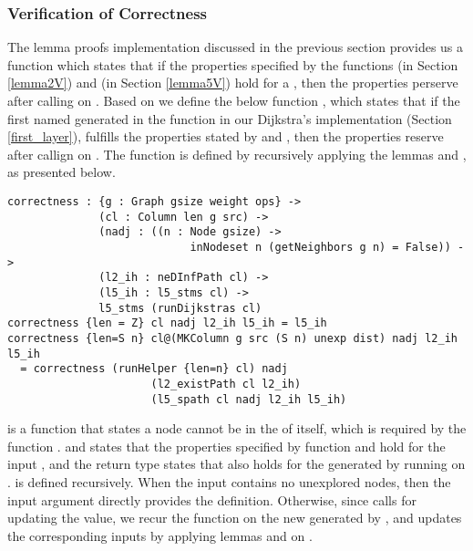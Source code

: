 \subsubsection{Verification of Correctness}
The lemma proofs implementation discussed in the previous section provides us a function  which states that if the  properties specified by the functions  (in Section \ref{lemma2V}) and (in Section \ref{lemma5V}) hold for a  , then the properties perserve after calling  on . Based on  we define the below function , which states that if the first  named  generated in the  function in our Dijkstra's implementation (Section \ref{first_layer}), fulfills the properties stated by  and , then the properties reserve after callign  on . The function  is defined by recursively applying the lemmas  and , as presented below. 
\\
\begin{lstlisting}
correctness : {g : Graph gsize weight ops} ->
              (cl : Column len g src) ->
              (nadj : ((n : Node gsize) -> 
                            inNodeset n (getNeighbors g n) = False)) ->
              (l2_ih : neDInfPath cl) ->
              (l5_ih : l5_stms cl) ->
              l5_stms (runDijkstras cl)
correctness {len = Z} cl nadj l2_ih l5_ih = l5_ih
correctness {len=S n} cl@(MKColumn g src (S n) unexp dist) nadj l2_ih l5_ih
  = correctness (runHelper {len=n} cl) nadj 
  				      (l2_existPath cl l2_ih) 
  				      (l5_spath cl nadj l2_ih l5_ih)
\end{lstlisting}


 is a function that states a node cannot be in the  of itself, which is required by the function .  and  states that the properties specified by function  and  hold for the input  , and the return type states that  also holds for the  generated by running  on .  is defined recursively. When the input  contains no unexplored nodes, then the input argument  directly provides the definition. Otherwise, since  calls  for updating the  value, we recur the  function on the new  generated by , and updates the corresponding inputs by applying lemmas  and  on . 
\\

